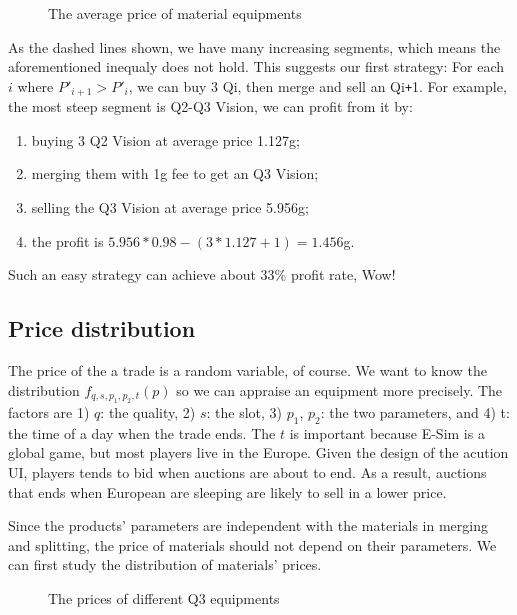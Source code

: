 \documentclass{manuscript}
\begin{document}
    \begin{figure}[ht]
        \centering
        
        \caption{The average price of material equipments}\label{fig:reg_price_quality}
    \end{figure}

    As the dashed lines shown, we have many increasing segments, which means the aforementioned inequaly does not hold.
    This suggests our first strategy: For each $i$ where $P'_{i+1} > P'_i$, we can buy 3 Qi, then merge and sell an
    Qi\verb!+!1. For example, the most steep segment is Q2-Q3 Vision, we can profit from it by:
    \begin{enumerate}[nosep]
        \item buying 3 Q2 Vision at average price 1.127g;
        \item merging them with 1g fee to get an Q3 Vision;
        \item selling the Q3 Vision at average price 5.956g;
        \item the profit is $5.956 * 0.98 - (3 * 1.127 + 1) = 1.456$g.
    \end{enumerate}
    Such an easy strategy can achieve about 33\% profit rate, Wow!

    \subsection{Price distribution}

    The price of the a trade is a random variable, of course. We want to know the distribution $f_{q, s, p_1, p_2, t}(p)$ so
    we can appraise an equipment more precisely. The factors are 1) $q$: the quality, 2) $s$: the slot, 3) $p_1$, $p_2$:
    the two parameters, and 4) t: the time of a day when the trade ends. The $t$ is important because E-Sim is a global
    game, but most players live in the Europe. Given the design of the acution UI, players tends to bid when auctions are
    about to end. As a result, auctions that ends when European are sleeping are likely to sell in a lower price.

    Since the products' parameters are independent with the materials in merging and splitting, the price of materials
    should not depend on their parameters. We can first study the distribution of materials' prices.

    \begin{figure}[ht]
        \centering
        
        \caption{The prices of different Q3 equipments}\label{fig:hist_material_price}
    \end{figure}
\end{document}
